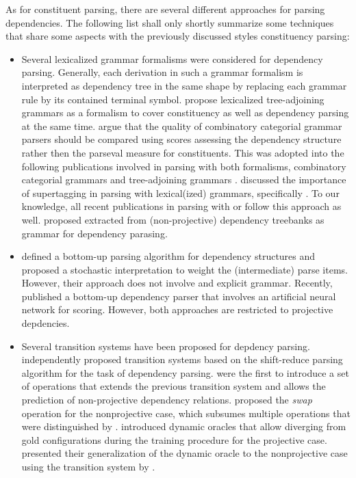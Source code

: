 \documentclass[../document.tex]{subfiles}
\begin{document}
    As for constituent parsing, there are several different approaches for parsing dependencies.
    The following list shall only shortly summarize some techniques that share some aspects with the previously discussed styles constituency parsing:
    \begin{itemize}
        \item Several lexicalized grammar formalisms were considered for dependency parsing. Generally, each derivation in such a grammar formalism is interpreted as dependency tree in the same shape by replacing each grammar rule by its contained terminal symbol. \citet{chiang2000statistical} propose lexicalized tree-adjoining grammars as a formalism to cover constituency as well as dependency parsing at the same time. \citet{hockenmaier2002generative} argue that the quality of combinatory categorial grammar parsers should be compared using scores assessing the dependency structure rather then the parseval measure for constituents. This was adopted into the following publications involved in parsing with both formalisms, combinatory categorial grammars and tree-adjoining grammars \citep{Kas17,Bla18}. \citet{Clark04} discussed the importance of supertagging in parsing with lexical(ized) grammars, specifically . To our knowledge, all recent publications in parsing with  or  follow this approach as well. \citep{Kas17,LewisSteedman14}   
        \citet{kuhlmann2009treebank} proposed  extracted from (non-projective) dependency treebanks as grammar for dependency parasing.
        \item \citet{eisner-1996-three} defined a bottom-up parsing algorithm for dependency structures and proposed a stochastic interpretation to weight the (intermediate) parse items. However, their approach does not involve and explicit grammar. Recently, \citet{yang-tu-2022-headed} published a bottom-up dependency parser that involves an artificial neural network for scoring. However, both approaches are restricted to projective depdencies.
        \item Several transition systems have been proposed for depdency parsing. \citet{nivre-2003-efficient, yamada-matsumoto-2003-statistical} independently proposed transition systems based on the shift-reduce parsing algorithm for the task of dependency parsing. \citet{attardi-2006-experiments} were the first to introduce a set of operations that extends the previous transition system and allows the prediction of non-projective dependency relations. \citet{nivre-2009-non} proposed the \emph{swap} operation for the nonprojective case, which subsumes multiple operations that were distinguished by \citet{attardi-2006-experiments}. \citet{Goldberg12} introduced dynamic oracles that allow diverging from gold configurations during the training procedure for the projective case. \citet{gomez2014polynomial} presented their generalization of the dynamic oracle to the nonprojective case using the transition system by \citet{attardi-2006-experiments}.
    \end{itemize}
\end{document}
